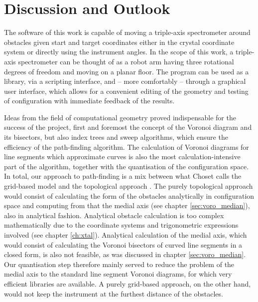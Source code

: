 %
%

\chapter{Discussion and Outlook}
\label{ch:outlook}
The software of this work is capable of moving a triple-axis spectrometer around obstacles 
given start and target coordinates either in the crystal coordinate system or directly using the instrument angles.
In the scope of this work, a triple-axis spectrometer can be thought of as a robot arm having three rotational
degrees of freedom and moving on a planar floor.
The program can be used as a library, via a scripting interface, and -- more comfortably -- through a graphical
user interface, which allows for a convenient editing of the geometry and testing of configuration
with immediate feedback of the results.

Ideas from the field of computational geometry proved indispensable for the success of the project,
first and foremost the concept of the Voronoi diagram and its bisectors, but also index trees and sweep 
algorithms, which ensure the efficiency of the path-finding algorithm.
The calculation of Voronoi diagrams for line segments which approximate curves is also the most
calculation-intensive part of the algorithm, together with the quantisation of the configuration space.
In total, our approach to path-finding is a mix between what Choset calls the grid-based model and the 
topological approach \cite{Choset2010_ch8}.
The purely topological approach would consist of calculating the form of the obstacles analytically in
configuration space and computing from that the medial axis (see chapter \ref{sec:voro_median}), also
in analytical fashion. 
Analytical obstacle calculation is too complex mathematically due to the coordinate systems and trigonometric
expressions involved (see chapter \ref{ch:xtal}). Analytical calculation of the medial axis, which would consist
of calculating the Voronoi bisectors of curved line segments in a closed form, is also not feasible, 
as was discussed in chapter \ref{sec:voro_median}.
Our quantisation step therefore mainly served to reduce the problem of the medial axis to the standard
line segment Voronoi diagrams, for which very efficient libraries are available. 
A purely grid-based approach, on the other hand, would not keep the instrument at the furthest distance
of the obstacles.


